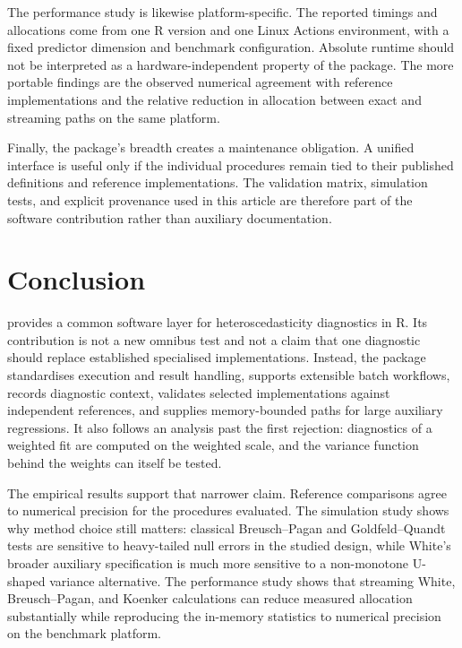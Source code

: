 The performance study is likewise platform-specific. The reported timings and
allocations come from one R version and one Linux Actions environment, with a
fixed predictor dimension and benchmark configuration. Absolute runtime should
not be interpreted as a hardware-independent property of the package. The more
portable findings are the observed numerical agreement with reference
implementations and the relative reduction in allocation between exact and
streaming paths on the same platform.

Finally, the package's breadth creates a maintenance obligation. A unified
interface is useful only if the individual procedures remain tied to their
published definitions and reference implementations. The validation matrix,
simulation tests, and explicit provenance used in this article are therefore
part of the software contribution rather than auxiliary documentation.

\section{Conclusion}\label{conclusion}

 provides a common software layer for heteroscedasticity
diagnostics in R. Its contribution is not a new omnibus test and not a claim
that one diagnostic should replace established specialised implementations.
Instead, the package standardises execution and result handling, supports
extensible batch workflows, records diagnostic context, validates selected
implementations against independent references, and supplies memory-bounded
paths for large auxiliary regressions. It also follows an analysis past the
first rejection: diagnostics of a weighted fit are computed on the weighted
scale, and the variance function behind the weights can itself be tested.

The empirical results support that narrower claim. Reference comparisons agree
to numerical precision for the procedures evaluated. The simulation study
shows why method choice still matters: classical Breusch--Pagan and
Goldfeld--Quandt tests are sensitive to heavy-tailed null errors in the studied
design, while White's broader auxiliary specification is much more sensitive to
a non-monotone U-shaped variance alternative. The performance study shows that
streaming White, Breusch--Pagan, and Koenker calculations can reduce measured
allocation substantially while reproducing the in-memory statistics to
numerical precision on the benchmark platform.

